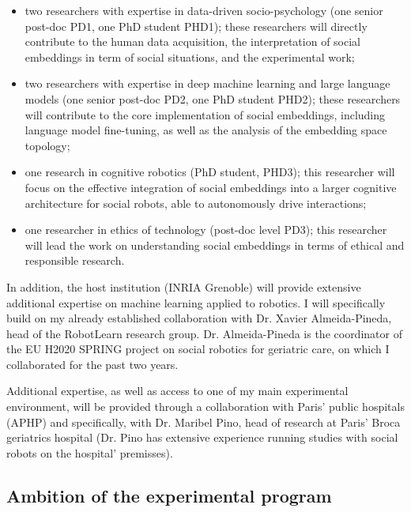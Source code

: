 \begin{itemize}

    \item  two researchers with expertise in data-driven
        socio-psychology (one senior post-doc PD1, one PhD student PHD1); these
        researchers will directly contribute to the human data acquisition,
        the interpretation of social embeddings in term of social situations,
        and the experimental work;

    \item two researchers with expertise in deep machine learning and large
        language models (one senior post-doc PD2, one PhD student PHD2); these
        researchers will contribute to the core implementation of social
        embeddings, including language model fine-tuning, as well as the
        analysis of the embedding space topology;

    \item one research in cognitive robotics (PhD student, PHD3); this
        researcher will focus on the effective integration of social
        embeddings into a larger cognitive architecture for social robots, able
        to autonomously drive interactions;

    \item one researcher in ethics of technology (post-doc
        level PD3); this researcher will lead the work on understanding social
        embeddings in terms of ethical and responsible research.
\end{itemize}

In addition, the host institution (INRIA Grenoble) will provide extensive
additional expertise on machine learning applied to robotics. I will specifically build on
my already established collaboration with Dr. Xavier Almeida-Pineda, head of the
RobotLearn research group. Dr. Almeida-Pineda is the coordinator of the EU H2020
SPRING project on social robotics for geriatric care, on which I collaborated
for the past two years.

Additional expertise, as well as access to one of my main experimental
environment, will be provided through a collaboration with Paris' public
hospitals (APHP) and specifically, with Dr. Maribel Pino, head of research at
Paris' Broca geriatrics hospital (Dr. Pino has extensive experience running
studies with social robots on the hospital' premisses).

\subsection{Ambition of the experimental program}

